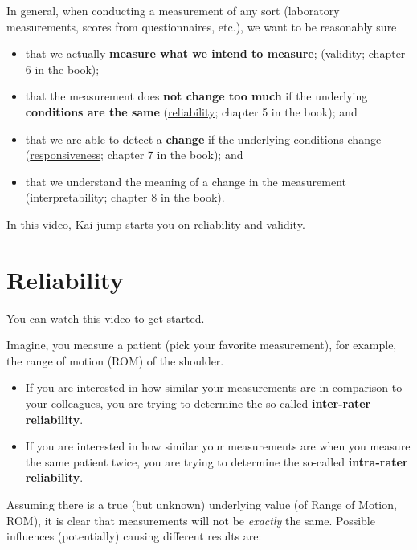\documentclass[
]{book}
\providecommand{\tightlist}{%
  \setlength{\itemsep}{0pt}\setlength{\parskip}{0pt}}
\begin{document}
In general, when conducting a measurement of any sort
(laboratory measurements, scores from questionnaires, etc.),
we want to be reasonably sure

\begin{itemize}
\tightlist
\item
  that we actually \textbf{measure what we intend to measure};
  (\href{https://en.wikipedia.org/wiki/Validity_(statistics)}{validity};
  chapter 6 in the book);
\item
  that the measurement does \textbf{not change too much} if the
  underlying \textbf{conditions are the same}
  (\href{https://en.wikipedia.org/wiki/Reliability_(statistics)}{reliability};
  chapter 5 in the book); and
\item
  that we are able to detect a \textbf{change} if the underlying conditions change
  (\href{https://tinyurl.com/3vdcxy49}{responsiveness}; chapter 7 in the book); and
\item
  that we understand the meaning of a change in the measurement
  (interpretability; chapter 8 in the book).
\end{itemize}

In this \href{https://www.youtube.com/watch?v=KuT2n1w0Ixc&ab_channel=Physiotutors}{video},
Kai jump starts you on reliability and validity.

\section{Reliability}\label{reliability}

You can watch this \href{https://www.youtube.com/watch?v=9HSoWaRpcys&ab_channel=Physiotutors}{video}
to get started.

Imagine, you measure a patient (pick your favorite measurement), for example,
the range of motion (ROM) of the shoulder.

\begin{itemize}
\tightlist
\item
  If you are interested in how
  similar your measurements are in comparison to your colleagues, you are
  trying to determine the so-called \textbf{inter-rater reliability}.
\item
  If you are interested in how similar your measurements are when you measure
  the same patient twice, you are trying to determine the so-called
  \textbf{intra-rater reliability}.
\end{itemize}

Assuming there is a true (but unknown) underlying value (of Range of Motion, ROM),
it is clear that measurements will not be \emph{exactly} the same.
Possible influences (potentially) causing different results are:
\end{document}
